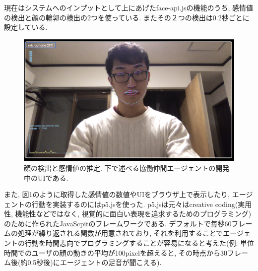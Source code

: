 \documentclass[a4paper,dvipdfmx]{hisken}
\begin{document}
現在はシステムへのインプットとして上にあげたface-api.jsの機能のうち, 感情値の検出と顔の輪郭の検出の2つを使っている. またその２つの検出は0.2秒ごとに設定している.

\begin{figure}
  \includegraphics[width=\linewidth]{detection00.png}
  \caption{顔の検出と感情値の推定. 下で述べる協働仲間エージェントの開発中のUIである.}
  \label{fig:detection}
\end{figure}

また, 図1のように取得した感情値の数値やUIをブラウザ上で表示したり, エージェントの行動を実装するのにはp5.jsを使った. p5.jsは元々はcreative coding(実用性, 機能性などではなく, 視覚的に面白い表現を追求するためのプログラミング)のために作られたJavaScpitのフレームワークである. デフォルトで毎秒60フレームの処理が繰り返される関数が用意されており, それを利用することでエージェントの行動を時間志向でプログラミングすることが容易になると考えた(例: 単位時間でのユーザの顔の動きの平均が100pixelを超えると, その時点から30フレーム後(約0.5秒後)にエージェントの足音が聞こえる). 
\end{document}
